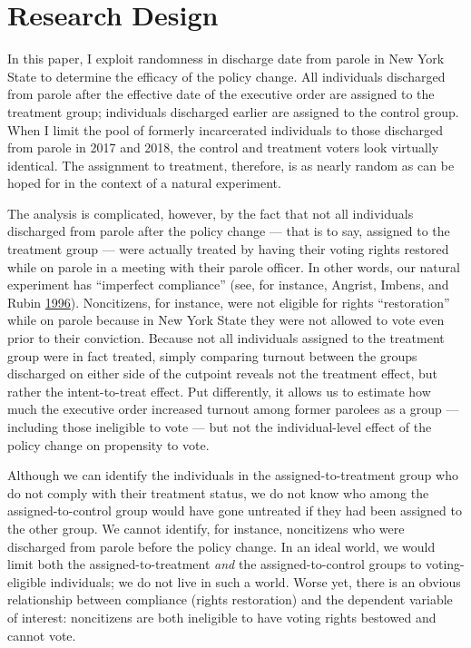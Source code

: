 \documentclass[
  12pt,
]{article}
\begin{document}
\hypertarget{research-design}{%
\section*{Research Design}\label{research-design}}

In this paper, I exploit randomness in discharge date from parole in New York State to determine the efficacy of the policy change. All individuals discharged from parole after the effective date of the executive order are assigned to the treatment group; individuals discharged earlier are assigned to the control group. When I limit the pool of formerly incarcerated individuals to those discharged from parole in 2017 and 2018, the control and treatment voters look virtually identical. The assignment to treatment, therefore, is as nearly random as can be hoped for in the context of a natural experiment.

The analysis is complicated, however, by the fact that not all individuals discharged from parole after the policy change --- that is to say, assigned to the treatment group --- were actually treated by having their voting rights restored while on parole in a meeting with their parole officer. In other words, our natural experiment has ``imperfect compliance'' (see, for instance, Angrist, Imbens, and Rubin \protect\hyperlink{ref-Angrist1996}{1996}). Noncitizens, for instance, were not eligible for rights ``restoration'' while on parole because in New York State they were not allowed to vote even prior to their conviction. Because not all individuals assigned to the treatment group were in fact treated, simply comparing turnout between the groups discharged on either side of the cutpoint reveals not the treatment effect, but rather the intent-to-treat effect. Put differently, it allows us to estimate how much the executive order increased turnout among former parolees as a group --- including those ineligible to vote --- but not the individual-level effect of the policy change on propensity to vote.

Although we can identify the individuals in the assigned-to-treatment group who do not comply with their treatment status, we do not know who among the assigned-to-control group would have gone untreated if they had been assigned to the other group. We cannot identify, for instance, noncitizens who were discharged from parole before the policy change. In an ideal world, we would limit both the assigned-to-treatment \emph{and} the assigned-to-control groups to voting-eligible individuals; we do not live in such a world. Worse yet, there is an obvious relationship between compliance (rights restoration) and the dependent variable of interest: noncitizens are both ineligible to have voting rights bestowed and cannot vote.
\end{document}
